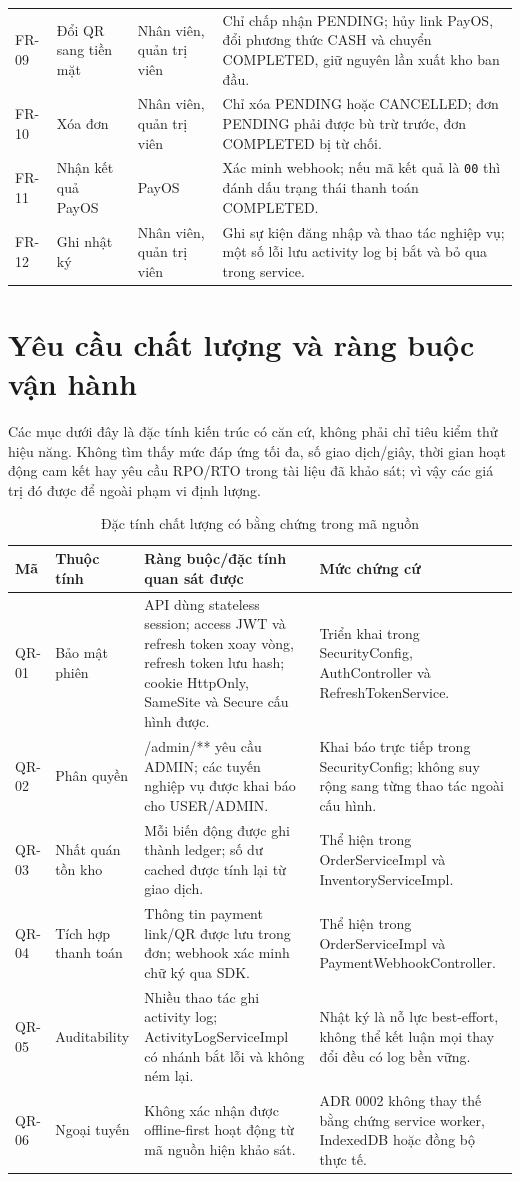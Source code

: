 \documentclass[12pt,a4paper,oneside]{report}
\begin{document}
\begin{longtable}{@{}p{1.5cm}p{4.2cm}p{3.0cm}p{6.0cm}@{}}
FR-09 & Đổi QR sang tiền mặt & Nhân viên, quản trị viên & Chỉ chấp nhận PENDING; hủy link PayOS, đổi phương thức CASH và chuyển COMPLETED, giữ nguyên lần xuất kho ban đầu.\\
FR-10 & Xóa đơn & Nhân viên, quản trị viên & Chỉ xóa PENDING hoặc CANCELLED; đơn PENDING phải được bù trừ trước, đơn COMPLETED bị từ chối.\\
FR-11 & Nhận kết quả PayOS & PayOS & Xác minh webhook; nếu mã kết quả là \texttt{00} thì đánh dấu trạng thái thanh toán COMPLETED.\\
FR-12 & Ghi nhật ký & Nhân viên, quản trị viên & Ghi sự kiện đăng nhập và thao tác nghiệp vụ; một số lỗi lưu activity log bị bắt và bỏ qua trong service.\\
\end{longtable}

\section{Yêu cầu chất lượng và ràng buộc vận hành}
Các mục dưới đây là đặc tính kiến trúc có căn cứ, không phải chỉ tiêu kiểm thử hiệu năng. Không tìm thấy mức đáp ứng tối đa, số giao dịch/giây, thời gian hoạt động cam kết hay yêu cầu RPO/RTO trong tài liệu đã khảo sát; vì vậy các giá trị đó được để ngoài phạm vi định lượng.
\begin{table}[htbp]
\centering\small
\caption{Đặc tính chất lượng có bằng chứng trong mã nguồn}
\begin{tabularx}{\textwidth}{@{}p{1.5cm}p{2.7cm}Yp{3.8cm}@{}}\toprule
Mã & Thuộc tính & Ràng buộc/đặc tính quan sát được & Mức chứng cứ\\\midrule
QR-01 & Bảo mật phiên & API dùng stateless session; access JWT và refresh token xoay vòng, refresh token lưu hash; cookie HttpOnly, SameSite và Secure cấu hình được. & Triển khai trong SecurityConfig, AuthController và RefreshTokenService.\\
QR-02 & Phân quyền & /admin/** yêu cầu ADMIN; các tuyến nghiệp vụ được khai báo cho USER/ADMIN. & Khai báo trực tiếp trong SecurityConfig; không suy rộng sang từng thao tác ngoài cấu hình.\\
QR-03 & Nhất quán tồn kho & Mỗi biến động được ghi thành ledger; số dư cached được tính lại từ giao dịch. & Thể hiện trong OrderServiceImpl và InventoryServiceImpl.\\
QR-04 & Tích hợp thanh toán & Thông tin payment link/QR được lưu trong đơn; webhook xác minh chữ ký qua SDK. & Thể hiện trong OrderServiceImpl và PaymentWebhookController.\\
QR-05 & Auditability & Nhiều thao tác ghi activity log; ActivityLogServiceImpl có nhánh bắt lỗi và không ném lại. & Nhật ký là nỗ lực best-effort, không thể kết luận mọi thay đổi đều có log bền vững.\\
QR-06 & Ngoại tuyến & Không xác nhận được offline-first hoạt động từ mã nguồn hiện khảo sát. & ADR 0002 không thay thế bằng chứng service worker, IndexedDB hoặc đồng bộ thực tế.\\
\bottomrule\end{tabularx}
\end{table}
\end{document}
